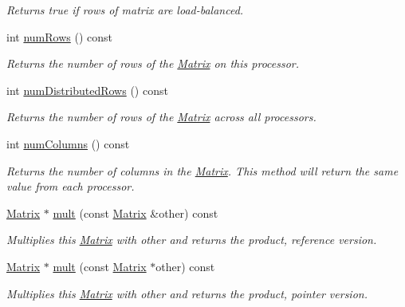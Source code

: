 \begin{DoxyCompactItemize}
\begin{DoxyCompactList}\small\item\em Returns true if rows of matrix are load-\/balanced. \end{DoxyCompactList}\item 
int \hyperlink{class_c_a_r_o_m_1_1_matrix_adbda42e4d009f8176b773ec0d87dd665}{num\-Rows} () const 
\begin{DoxyCompactList}\small\item\em Returns the number of rows of the \hyperlink{class_c_a_r_o_m_1_1_matrix}{Matrix} on this processor. \end{DoxyCompactList}\item 
int \hyperlink{class_c_a_r_o_m_1_1_matrix_a1fa97045bd32621d803043ccab7f715f}{num\-Distributed\-Rows} () const 
\begin{DoxyCompactList}\small\item\em Returns the number of rows of the \hyperlink{class_c_a_r_o_m_1_1_matrix}{Matrix} across all processors. \end{DoxyCompactList}\item 
int \hyperlink{class_c_a_r_o_m_1_1_matrix_ac0fae4db551542e9a5cdc401a38fe39f}{num\-Columns} () const 
\begin{DoxyCompactList}\small\item\em Returns the number of columns in the \hyperlink{class_c_a_r_o_m_1_1_matrix}{Matrix}. This method will return the same value from each processor. \end{DoxyCompactList}\item 
\hyperlink{class_c_a_r_o_m_1_1_matrix}{Matrix} $\ast$ \hyperlink{class_c_a_r_o_m_1_1_matrix_a67ae901268ab6138bf2bf9822da4fb10}{mult} (const \hyperlink{class_c_a_r_o_m_1_1_matrix}{Matrix} \&other) const 
\begin{DoxyCompactList}\small\item\em Multiplies this \hyperlink{class_c_a_r_o_m_1_1_matrix}{Matrix} with other and returns the product, reference version. \end{DoxyCompactList}\item 
\hyperlink{class_c_a_r_o_m_1_1_matrix}{Matrix} $\ast$ \hyperlink{class_c_a_r_o_m_1_1_matrix_a5b9c4e3d533410020e65ddc9d85c773d}{mult} (const \hyperlink{class_c_a_r_o_m_1_1_matrix}{Matrix} $\ast$other) const 
\begin{DoxyCompactList}\small\item\em Multiplies this \hyperlink{class_c_a_r_o_m_1_1_matrix}{Matrix} with other and returns the product, pointer version. \end{DoxyCompactList}\item 

\end{DoxyCompactItemize}
